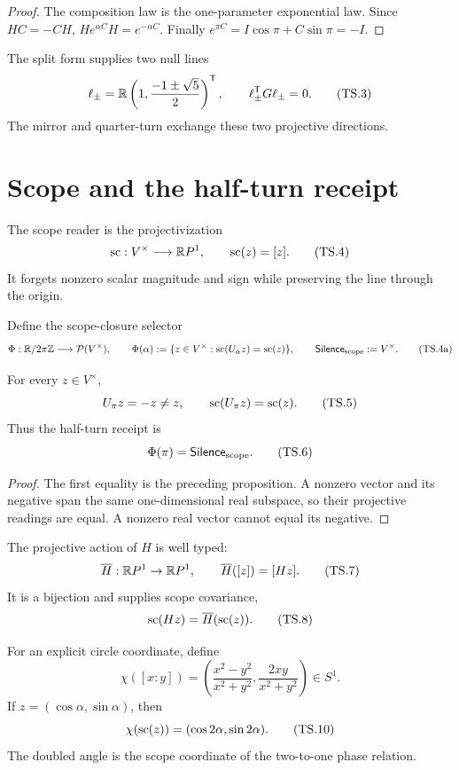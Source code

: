 \documentclass[10pt]{article}
\begin{document}
\begin{proof}
The composition law is the one-parameter exponential law. Since $HC=-CH$,
$H e^{\alpha C}H=e^{-\alpha C}$. Finally
$e^{\pi C}=I\cos\pi+C\sin\pi=-I$.
\end{proof}

The split form supplies two null lines
\[
\ell_\pm=\mathbb R\left(1,\frac{-1\pm\sqrt5}{2}\right)^{\mathsf T},
\qquad \ell_\pm^{\mathsf T}G\ell_\pm=0.
\tag{TS.3}
\]
The mirror and quarter-turn exchange these two projective directions.

\section{Scope and the half-turn receipt}

\begin{definition}
The scope reader is the projectivization
\[
\operatorname{sc}:V^\times\longrightarrow\mathbb R P^1,\qquad \operatorname{sc}(z)=[z].
\tag{TS.4}
\]
It forgets nonzero scalar magnitude and sign while preserving the line through
the origin.
\end{definition}

Define the scope-closure selector
\[
\Phi:\mathbb R/2\pi\mathbb Z\longrightarrow\mathcal P(V^\times),
\qquad
\Phi(\alpha):=
\{z\in V^\times:\operatorname{sc}(U_\alpha z)=\operatorname{sc}(z)\},
\qquad
\mathsf{Silence}_{\rm scope}:=V^\times.
\tag{TS.4a}
\]

\begin{theorem}
For every $z\in V^\times$,
\[
U_\pi z=-z\ne z,\qquad \operatorname{sc}(U_\pi z)=\operatorname{sc}(z).
\tag{TS.5}
\]
Thus the half-turn receipt is
\[
\Phi(\pi)=\mathsf{Silence}_{\rm scope}.
\tag{TS.6}
\]
\end{theorem}

\begin{proof}
The first equality is the preceding proposition. A nonzero vector and its
negative span the same one-dimensional real subspace, so their projective
readings are equal. A nonzero real vector cannot equal its negative.
\end{proof}

The projective action of $H$ is well typed:
\[
\overline H:\mathbb R P^1\to\mathbb R P^1,\qquad \overline H([z])=[Hz].
\tag{TS.7}
\]
It is a bijection and supplies scope covariance,
\[
\operatorname{sc}(Hz)=\overline H(\operatorname{sc}(z)).
\tag{TS.8}
\]

For an explicit circle coordinate, define
\[
\chi([x:y])=
\left(\frac{x^2-y^2}{x^2+y^2},\frac{2xy}{x^2+y^2}\right)\in S^1.
\tag{TS.9}
\]
If $z=(\cos\alpha,\sin\alpha)$, then
\[
\chi(\operatorname{sc}(z))=(\cos2\alpha,\sin2\alpha).
\tag{TS.10}
\]
The doubled angle is the scope coordinate of the two-to-one phase relation.
\end{document}

